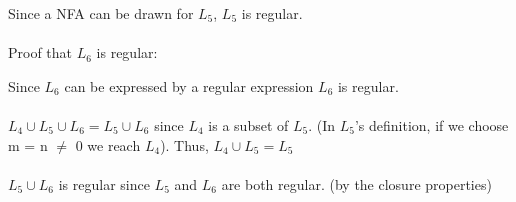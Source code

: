 \documentclass[12pt]{article}
\begin{document}
Since a NFA can be drawn for $L_5$, $L_5$ is regular.\\\\
Proof that $L_6$ is regular:

Since $L_6$ can be expressed by a regular expression $L_6$ is regular.\\\\

$L_4\cup L_5\cup L_6 = L_5\cup L_6$ since $L_4$ is a subset of $L_5$. (In $L_5$'s definition, if we choose m = n $\neq$ 0 we reach $L_4$). Thus, $L_4\cup L_5 = L_5$\\\\
$L_5\cup L_6$ is regular since $L_5$ and $L_6$ are both regular. (by the closure properties)
\end{document}
